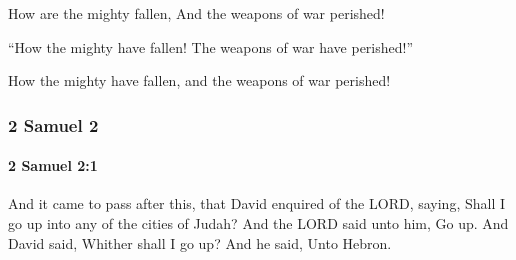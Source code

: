 			\begin{versebox}
					\item[BHS] 
					\item[ASV] How are the mighty fallen, And the weapons of war perished!
					\item[NIV] “How the mighty have fallen! The weapons of war have perished!”
					\item[NRSV] How the mighty have fallen, and the weapons of war perished!
			\end{versebox}
			
	\subsubsection{2 Samuel 2} %
		\label{2SAMUEL-2}

		\paragraph{2 Samuel 2:1} %
			\label{2SAMUEL-2-1}

			And it came to pass after this, that David enquired of the LORD, saying, Shall I go up into any of the cities of Judah? And the LORD said unto him, Go up. And David said, Whither shall I go up? And he said, Unto Hebron.

